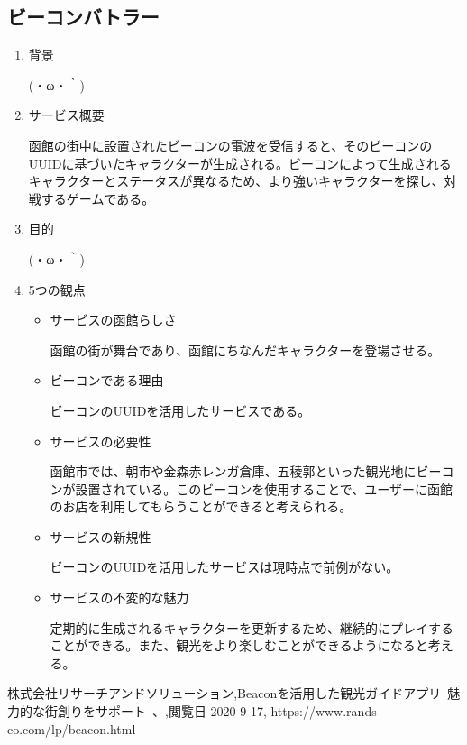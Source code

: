 \subsection{ビーコンバトラー}
\begin{enumerate}
    \item 背景
    \par (・ω・｀)
    \item サービス概要
    \par 函館の街中に設置されたビーコンの電波を受信すると、そのビーコンのUUIDに基づいたキャラクターが生成される。ビーコンによって生成されるキャラクターとステータスが異なるため、より強いキャラクターを探し、対戦するゲームである。
    \item 目的
    \par (・ω・｀)
    \item 5つの観点
    \begin{itemize}
        \item サービスの函館らしさ
        \par 函館の街が舞台であり、函館にちなんだキャラクターを登場させる。
        \item ビーコンである理由
        \par ビーコンのUUIDを活用したサービスである。
        \item サービスの必要性
        \par 函館市では、朝市や金森赤レンガ倉庫、五稜郭といった観光地にビーコンが設置されている。このビーコンを使用することで、ユーザーに函館のお店を利用してもらうことができると考えられる。
        \item サービスの新規性
        \par ビーコンのUUIDを活用したサービスは現時点で前例がない。
        \item サービスの不変的な魅力
        \par 定期的に生成されるキャラクターを更新するため、継続的にプレイすることができる。また、観光をより楽しむことができるようになると考える。
    \end{itemize}
\end{enumerate}

\begin{thebibliography}{9}
  株式会社リサーチアンドソリューション,Beaconを活用した観光ガイドアプリ~魅力的な街創りをサポート~、,閲覧日 2020-9-17, https://www.rands-co.com/lp/beacon.html
\end{thebibliography}
